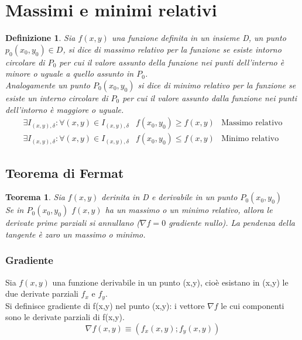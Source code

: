 \documentclass{book}
\newtheorem{teorema}{Teorema}
\newtheorem{defi}{Definizione}
\begin{document}
\section{Massimi e minimi relativi}
\begin{defi}
  Sia $f(x,y)$ una funzione definita in un insieme D, un punto $p_0(x_0,y_0)\in D$, si dice di {\color{red}
    massimo relativo} per la funzione se esiste intorno circolare di $P_0$ per cui il valore assunto della
  funzione nei punti dell'interno è minore o uguale a quello assunto in $P_0$.\\
  Analogamente un punto $P_0(x_0,y_0)$ si dice di {\color{red} minimo relativo} per la funzione se esiste un
  interno circolare di $P_0$ per cui il valore assunto dalla funzione nei punti dell'intorno è maggiore o uguale.
  \begin{equation*}
    \begin{matrix}
      \exists I_{(x,y),\delta}:\forall (x,y)\in I_{(x,y),\delta} & f(x_0,y_0)\geq f(x,y) & \text{Massimo relativo}\\
      \exists I_{(x,y),\delta}:\forall (x,y)\in I_{(x,y),\delta} & f(x_0,y_0)\leq f(x,y) & \text{Minimo relativo}
    \end{matrix}
  \end{equation*} 
\end{defi}
\subsection{Teorema di Fermat}
\begin{teorema}
  Sia $f(x,y)$ derinita in D e derivabile in un punto $P_0 (x_0,y_0)$\\
  Se in $P_0(x_0,y_0)$ $f(x,y)$ ha un massimo o un minimo relativo, allora le derivate prime
  parziali si annullano ($\nabla f=0$ gradiente nullo). La pendenza della tangente è zaro un
  massimo o minimo.
\end{teorema}
\subsubsection{Gradiente}
Sia $f(x,y)$ una funzione derivabile in un punto (x,y), cioè esistano in (x,y) le due derivate
parziali $f_x$ e $f_y$.\\
Si definisce {\color{red} gradiente} di f(x,y) nel punto (x,y): i vettore $\nabla f$ le cui componenti sono le derivate parziali di f(x,y).
\begin{equation}
  \nabla f(x,y) \equiv (f_x(x,y); f_y(x,y))
\end{equation}
\end{document}
